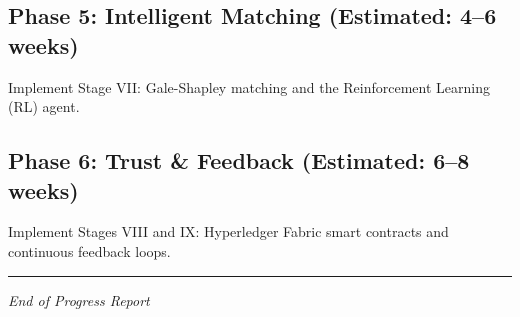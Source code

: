 \documentclass[11pt]{article}
\begin{document}
\subsection{Phase 5: Intelligent Matching (Estimated: 4--6 weeks)}
Implement Stage VII: Gale-Shapley matching and the Reinforcement Learning (RL) agent.

\subsection{Phase 6: Trust \& Feedback (Estimated: 6--8 weeks)}
Implement Stages VIII and IX: Hyperledger Fabric smart contracts and continuous feedback loops.

\vspace{1cm}
\begin{center}
\rule{0.6\textwidth}{0.4pt}
\par\vspace{0.3cm}
{\itshape End of Progress Report}
\end{center}
\end{document}
